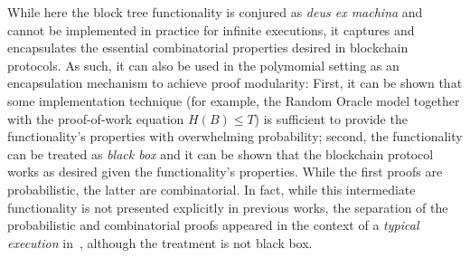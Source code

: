 \begin{remark}
While here the block tree functionality is conjured as
\emph{deus ex machina} and cannot be implemented in practice for infinite
executions, it captures and encapsulates the essential combinatorial properties
desired in blockchain protocols. As such, it can also be used in the polymomial
setting as an encapsulation mechanism to achieve proof modularity: First,
it can be shown that some implementation technique (for example, the Random
Oracle model together with the proof-of-work equation $H(B) \leq T$) is
sufficient to provide the functionality's properties with overwhelming
probability; second, the functionality can be treated as \emph{black box} and it
can be shown that the blockchain protocol works as desired given the
functionality's properties. While the first proofs are probabilistic, the latter
are combinatorial. In fact, while this intermediate functionality is not
presented explicitly in previous works, the separation of the probabilistic and
combinatorial proofs appeared in the context of a \emph{typical execution}
in~\cite{EC:GarKiaLeo15}, although the treatment is not black box.
\end{remark}
